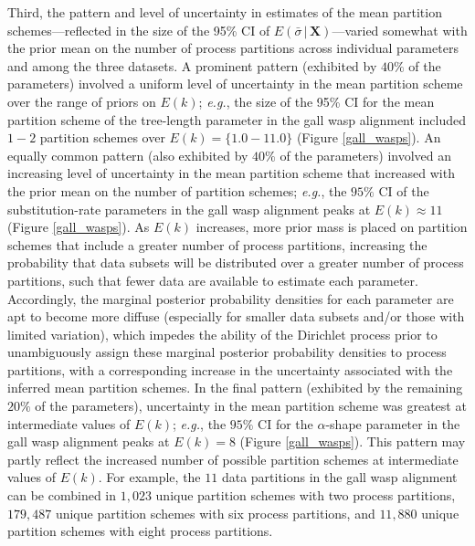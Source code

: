 \documentclass[11pt]{article}
\newcommand{\given}{\ensuremath{\,|\,}}
\begin{document}
Third, the pattern and level of uncertainty in estimates of the mean partition schemes---reflected in the size of the 95\% CI of $E(\bar{\sigma} \given \mathbf{X})$---varied somewhat with the prior mean on the number of process partitions across individual parameters and among the three datasets.  
A prominent pattern (exhibited by $40\%$ of the parameters) involved a uniform level of uncertainty in the mean partition scheme over the range of priors on $E(k)$; {\it e.g.}, the size of the 95\% CI for the mean partition scheme of the tree-length parameter in the gall wasp alignment included $1-2$ partition schemes over $E(k) = \{1.0-11.0\}$ (Figure \ref{gall_wasps}).  
An equally common pattern (also exhibited by $40\%$ of the parameters) involved an increasing level of uncertainty in the mean partition scheme that increased with the prior mean on the number of partition schemes; {\it e.g.}, the $95\%$ CI of the substitution-rate parameters in the gall wasp alignment peaks at $E(k) \approx 11$ (Figure \ref{gall_wasps}).  
As $E(k)$ increases, more prior mass is placed on partition schemes that include a greater number of process partitions, increasing the probability that data subsets will be distributed over a greater number of process partitions, such that fewer data are available to estimate each parameter.  
Accordingly, the marginal posterior probability densities for each parameter are apt to become more diffuse (especially for smaller data subsets and/or those with limited variation), which impedes the ability of the Dirichlet process prior to unambiguously assign these marginal posterior probability densities to process partitions, with a corresponding increase in the uncertainty associated with the inferred mean partition schemes. 
In the final pattern (exhibited by the remaining $20\%$ of the parameters), uncertainty in the mean partition scheme was greatest at intermediate values of $E(k)$; {\it e.g.}, the $95\%$ CI for the $\alpha$-shape parameter in the gall wasp alignment peaks at $E(k) = 8$ (Figure \ref{gall_wasps}).  
This pattern may partly reflect the increased number of possible partition schemes at intermediate values of $E(k)$.  
For example, the $11$ data partitions in the gall wasp alignment can be combined in $1,023$ unique partition schemes with two process partitions, $179,487$ unique partition schemes with six process partitions, and $11,880$ unique partition schemes with eight process partitions.  
\end{document}
